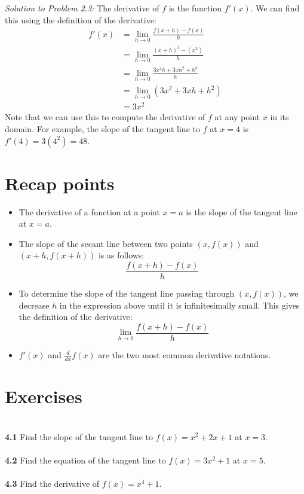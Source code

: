 \documentclass[11pt]{scrartcl}
\begin{document}
\noindent
\textit{Solution to Problem 2.3:} The derivative of $f$ is the function $f'(x)$. We can find this using the definition of the derivative: 
\begin{align*}
    f'(x) &= \lim_{h \to 0} \frac{f(x+h)-f(x)}{h}\\
          &= \lim_{h \to 0} \frac{(x+h)^3-(x^3)}{h}\\
          &= \lim_{h \to 0} \frac{3x^2h+3xh^2+h^3}{h}\\
          &= \lim_{h \to 0} (3x^2+3xh+h^2)\\
          &= 3x^2
\end{align*}
Note that we can use this to compute the derivative of $f$ at any point $x$ in its domain. For example, the slope of the tangent line to $f$ at $x=4$ is $f'(4)=3(4^2)=48$. 
\section{Recap points}
\begin{itemize}
    \item The derivative of a function at a point $x=a$ is the slope of the tangent line at $x=a$.  
    \item The slope of the secant line between two points $(x, f(x))$ and $(x+h, f(x+h))$ is as follows: 
    $$\frac{f(x+h)-f(x)}{h}$$
    \item To determine the slope of the tangent line passing through $(x, f(x))$, we decrease $h$ in the expression above until it is infinitesimally small. This gives the definition of the derivative: 
    $$\lim_{h \to 0}\frac{f(x+h)-f(x)}{h}$$
    \item $f'(x)$ and $\frac{d}{dx}f(x)$ are the two most common derivative notations. 
\end{itemize}
\section{Exercises}\\
\noindent
\textbf{4.1} Find the slope of the tangent line to $f(x)=x^2+2x+1$ at $x=3$. \\
\\
\noindent
\textbf{4.2} Find the equation of the tangent line to $f(x)=3x^2+1$ at $x=5$. \\
\\
\noindent
\textbf{4.3} Find the derivative of $f(x)=x^4+1$.
\end{document}
